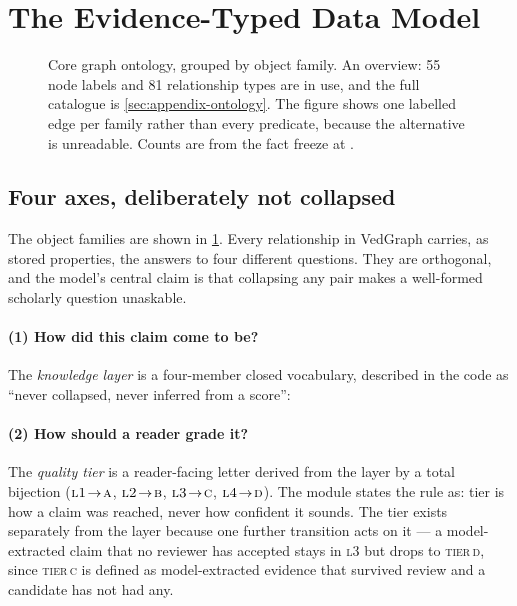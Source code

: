 \section{The Evidence-Typed Data Model}
\label{sec:model}

\begin{figure}[tbp]
\centering
\resizebox{\textwidth}{!}{}
\caption{Core graph ontology, grouped by object family. An overview: 55 node labels
and 81 relationship types are in use, and the full catalogue is
\cref{sec:appendix-ontology}. The figure shows one labelled edge per family rather
than every predicate, because the alternative is unreadable. Counts are from the
fact freeze at .}
\label{fig:ontology}
\end{figure}

\subsection{Four axes, deliberately not collapsed}

The object families are shown in \cref{fig:ontology}. Every relationship in
VedGraph carries, as stored properties, the answers to four different questions. They are orthogonal, and the model's central claim is that
collapsing any pair makes a well-formed scholarly question unaskable.

\paragraph{(1) How did this claim come to be?} The \emph{knowledge layer} is a
four-member closed vocabulary, described in the code as ``never collapsed, never
inferred from a score'':



\paragraph{(2) How should a reader grade it?} The \emph{quality tier} is a
reader-facing letter derived from the layer by a total bijection
($\textsc{l1}\!\to\!\textsc{a}$, $\textsc{l2}\!\to\!\textsc{b}$,
$\textsc{l3}\!\to\!\textsc{c}$, $\textsc{l4}\!\to\!\textsc{d}$). The module states the
rule as: tier is how a claim was reached, never how confident it sounds. The tier
exists separately from the layer because one further transition acts on it --- a
model-extracted claim that no reviewer has accepted stays in \textsc{l3} but drops to
\textsc{tier\,d}, since \textsc{tier\,c} is defined as model-extracted evidence that
survived review and a candidate has not had any.


